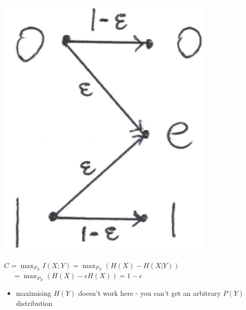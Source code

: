 \documentclass[10pt, landscape]{article}
\begin{document}
\begin{multicols*}{4}
\begin{itemize}
\begin{itemize}
\begin{minipage}[c]{0.75\linewidth}
\begin{itemize}
            \end{itemize}
          \end{minipage}
          \begin{minipage}[c]{0.2\linewidth}
            \includegraphics[width=0.95\linewidth]{cs3236-binary-erasure-channel.png} 
          \end{minipage}
          \( {\displaystyle{ C = \max_{P_X} I(X;Y) = \max_{P_X} ( H(X) - H(X\vert Y) ) }} \) 
          \( {\displaystyle{ \,\quad = \max_{P_X} (H(X) - \epsilon H(X)) = 1-\epsilon }} \) 
          \begin{itemize}
            \item maximising $H(Y)$ doesn't work here - you can't get an arbitrary $P(Y)$ distribution
          \end{itemize}
      \end{itemize}
  \end{itemize}






\end{multicols*}
\end{document}
